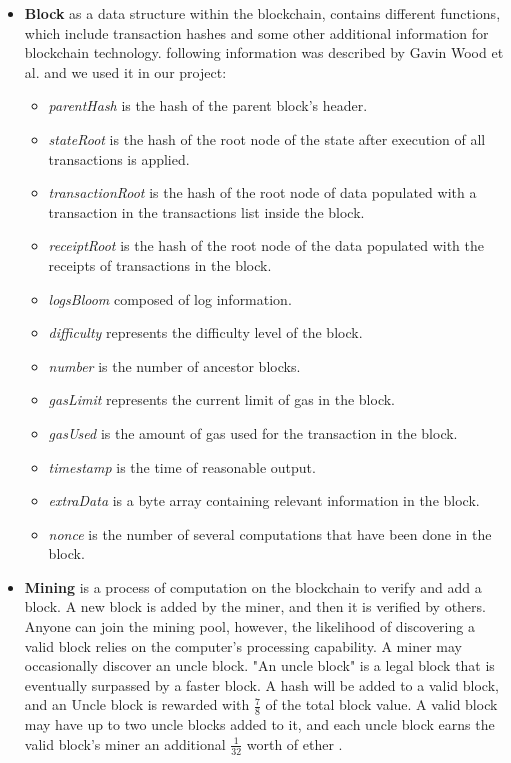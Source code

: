 \begin{itemize}
   \item \textbf{Block} as a data structure within the blockchain, contains different functions, which include transaction hashes and some other additional information for blockchain technology. following information was described by Gavin Wood et al. \cite{Gavin} and we used it in our project: \\
    \begin{itemize}
        \item \textit{parentHash} is the hash of the parent block's header.
        \item \textit{stateRoot} is the hash of the root node of the state after execution of all transactions is applied.
        \item \textit{transactionRoot} is the hash of the root node of data populated with a transaction in the transactions list inside the block.
        \item \textit{receiptRoot} is the hash of the root node of the data populated with the receipts of transactions in the block.
        \item \textit{logsBloom} composed of log information.
        \item \textit{difficulty} represents the difficulty level of the block.
        \item \textit{number} is the number of ancestor blocks.
        \item \textit{gasLimit} represents the current limit of gas in the block.
        \item \textit{gasUsed} is the amount of gas used for the transaction in the block.
        \item \textit{timestamp} is the time of reasonable output.
        \item \textit{extraData} is a byte array containing relevant information in the block.
        \item \textit{nonce} is the number of several computations that have been done in the block.
    \end{itemize}
    \item \textbf{Mining} is a process of computation on the blockchain to verify and add a block. A new block is added by the miner, and then it is verified by others. Anyone can join the mining pool, however, the likelihood of discovering a valid block relies on the computer's processing capability. A miner may occasionally discover an uncle block. "An uncle block" is a legal block that is eventually surpassed by a faster block. A hash will be added to a valid block, and an Uncle block is rewarded with $\frac{7}{8}$ of the total block value. A valid block may have up to two uncle blocks added to it, and each uncle block earns the valid block's miner an additional $\frac{1}{32}$ worth of ether \cite{Egbertsen}.
\end{itemize}
